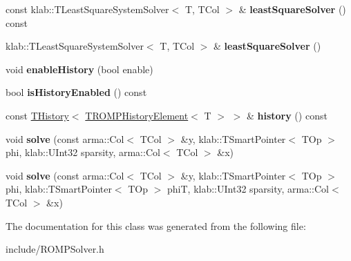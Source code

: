 \begin{DoxyCompactItemize}
\item 
const klab\+::\+T\+Least\+Square\+System\+Solver$<$ T, T\+Col $>$ \& {\bfseries least\+Square\+Solver} () const \hypertarget{classkl1p_1_1TROMPSolver_a57378a0a392f7061704e209d2b77f7bd}{}\label{classkl1p_1_1TROMPSolver_a57378a0a392f7061704e209d2b77f7bd}

\item 
klab\+::\+T\+Least\+Square\+System\+Solver$<$ T, T\+Col $>$ \& {\bfseries least\+Square\+Solver} ()\hypertarget{classkl1p_1_1TROMPSolver_a6088ffc4ee277d08a4a67d73971ad423}{}\label{classkl1p_1_1TROMPSolver_a6088ffc4ee277d08a4a67d73971ad423}

\item 
void {\bfseries enable\+History} (bool enable)\hypertarget{classkl1p_1_1TROMPSolver_a76c3fc32fc039d69fd665c651bc5fd73}{}\label{classkl1p_1_1TROMPSolver_a76c3fc32fc039d69fd665c651bc5fd73}

\item 
bool {\bfseries is\+History\+Enabled} () const \hypertarget{classkl1p_1_1TROMPSolver_adb0b029e775b36b754a9a52bbfbe0053}{}\label{classkl1p_1_1TROMPSolver_adb0b029e775b36b754a9a52bbfbe0053}

\item 
const \hyperlink{classkl1p_1_1THistory}{T\+History}$<$ \hyperlink{classkl1p_1_1TROMPHistoryElement}{T\+R\+O\+M\+P\+History\+Element}$<$ T $>$ $>$ \& {\bfseries history} () const \hypertarget{classkl1p_1_1TROMPSolver_a5e967afb99df20d5dfd1940574c8f69b}{}\label{classkl1p_1_1TROMPSolver_a5e967afb99df20d5dfd1940574c8f69b}

\item 
void {\bfseries solve} (const arma\+::\+Col$<$ T\+Col $>$ \&y, klab\+::\+T\+Smart\+Pointer$<$ T\+Op $>$ phi, klab\+::\+U\+Int32 sparsity, arma\+::\+Col$<$ T\+Col $>$ \&x)\hypertarget{classkl1p_1_1TROMPSolver_af9803862a7b893826e172af006343282}{}\label{classkl1p_1_1TROMPSolver_af9803862a7b893826e172af006343282}

\item 
void {\bfseries solve} (const arma\+::\+Col$<$ T\+Col $>$ \&y, klab\+::\+T\+Smart\+Pointer$<$ T\+Op $>$ phi, klab\+::\+T\+Smart\+Pointer$<$ T\+Op $>$ phiT, klab\+::\+U\+Int32 sparsity, arma\+::\+Col$<$ T\+Col $>$ \&x)\hypertarget{classkl1p_1_1TROMPSolver_aaae37f75d1bc34f1964521fa5f95dbd3}{}\label{classkl1p_1_1TROMPSolver_aaae37f75d1bc34f1964521fa5f95dbd3}

\end{DoxyCompactItemize}


The documentation for this class was generated from the following file\+:\begin{DoxyCompactItemize}
\item 
include/R\+O\+M\+P\+Solver.\+h\end{DoxyCompactItemize}
